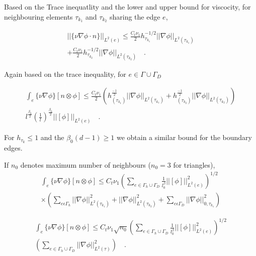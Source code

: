 \documentclass[a4paper]{book}
\begin{document}
Based on the Trace inequatlity and the lower and upper bound for viscocity, for neighbouring elements $\tau_{k_1}$ and $\tau_{k_2}$ sharing the edge $e$, 

\begin{equation}
\begin{split}
||\lbrace \nu \nabla \phi \cdot n \rbrace||_{L^2(e)} \leq \frac{C_t \nu_1}{2} {h_{\tau_{k_1}}^{-1/2}} ||\nabla \phi||_{L^2({\tau_{k_1}})} \\ + \frac{C_t \nu_1}{2} {h_{{\tau_{k_2}}}^{-1/2}} ||\nabla \phi||_{L^2({\tau_{k_2}})} \quad \textrm{.}
\end{split}
\end{equation}

Again based on the trace inequality, for $e \in \Gamma \cup \Gamma_D$

\begin{equation}
\begin{split}
\int_e \lbrace \nu \nabla \phi \rbrace [n \otimes \phi] \leq \frac{C_t \nu_1}{2}  \left( h_{(\tau_{k_1})}^{\frac{-1}{2}} ||\nabla \phi||_{L^2{(\tau_{k_1})}} + {h_{(\tau_{k_2})}^{\frac{-1}{2}}} ||\nabla \phi||_{L^2{(\tau_{k_2})}} \right) \\ l^{\frac{\beta_0}{2}} \left({\frac{1}{l}}\right)^{\frac{\beta_0}{2}} ||[\phi]||_{L^2(e)} \quad \textrm{.}
\end{split}
\end{equation}

For $h_{\tau_k} \leq 1$ and the $\beta_0 (d-1) \geq 1$ we obtain a similar bound for the boundary edges.

If $n_0$ denotes maximum number of neighbours ($n_0 = 3$ for triangles),
\begin{equation}
\begin{split}
\int_e \lbrace \nu \nabla \phi \rbrace[n \otimes \phi] \leq C_t \nu_1 \left( \sum_{e \in \Gamma_h \cup \Gamma_D} \frac{1}{l^\beta_0} ||[\phi]||^2_{L^2(e)} \right)^{1/2} \\ \times \left( \sum_{e \epsilon \Gamma_h} ||\nabla \phi||^2_{L^2(\tau_{k_1})} + ||\nabla \phi||^2_{L^2(\tau_{k_2})} + \sum_{e \epsilon \Gamma_D} ||\nabla \phi||^2_{0,\tau_{k_1}} \right)
\end{split}
\end{equation}

\begin{equation}
\begin{split}
\int_e \lbrace \nu \nabla \phi \rbrace[n \otimes \phi] \leq C_t \nu_1 \sqrt{n_0} \left( \sum_{e \in \Gamma_h \cup \Gamma_D} \frac{1}{l^\beta_0} ||[\phi]||^2_{L^2(e)} \right)^{1/2} \\ \left( \sum_{e \in \Gamma_h \cup \Gamma_D} ||\nabla \phi||^2_{L^2(\tau)} \right) \quad \textrm{.}
\end{split}
\end{equation}
\end{document}
